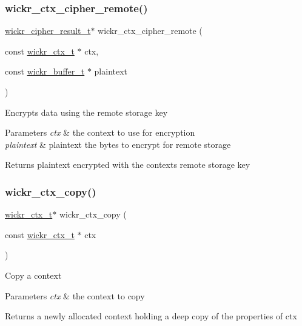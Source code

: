 \subsubsection{\texorpdfstring{wickr\+\_\+ctx\+\_\+cipher\+\_\+remote()}{wickr\_ctx\_cipher\_remote()}}
{\footnotesize\ttfamily \mbox{\hyperlink{structwickr__cipher__result}{wickr\+\_\+cipher\+\_\+result\+\_\+t}}$\ast$ wickr\+\_\+ctx\+\_\+cipher\+\_\+remote (\begin{DoxyParamCaption}\item[{const \mbox{\hyperlink{structwickr__ctx}{wickr\+\_\+ctx\+\_\+t}} $\ast$}]{ctx,  }\item[{const \mbox{\hyperlink{structwickr__buffer}{wickr\+\_\+buffer\+\_\+t}} $\ast$}]{plaintext }\end{DoxyParamCaption})}

Encrypts data using the remote storage key


\begin{DoxyParams}{Parameters}
{\em ctx} & the context to use for encryption \\
\hline
{\em plaintext} & plaintext the bytes to encrypt for remote storage \\
\hline
\end{DoxyParams}
\begin{DoxyReturn}{Returns}
\textquotesingle{}plaintext\textquotesingle{} encrypted with the context\textquotesingle{}s remote storage key 
\end{DoxyReturn}
\mbox{\label{group__wickr__ctx_gaaa74a32619fb3b382fbeeeddc425a910}} 
\subsubsection{\texorpdfstring{wickr\+\_\+ctx\+\_\+copy()}{wickr\_ctx\_copy()}}
{\footnotesize\ttfamily \mbox{\hyperlink{structwickr__ctx}{wickr\+\_\+ctx\+\_\+t}}$\ast$ wickr\+\_\+ctx\+\_\+copy (\begin{DoxyParamCaption}\item[{const \mbox{\hyperlink{structwickr__ctx}{wickr\+\_\+ctx\+\_\+t}} $\ast$}]{ctx }\end{DoxyParamCaption})}

Copy a context


\begin{DoxyParams}{Parameters}
{\em ctx} & the context to copy \\
\hline
\end{DoxyParams}
\begin{DoxyReturn}{Returns}
a newly allocated context holding a deep copy of the properties of \textquotesingle{}ctx\textquotesingle{} 
\end{DoxyReturn}
\mbox{\label{group__wickr__ctx_ga085975d71519bf5729a7cf264a5f7876}} 
